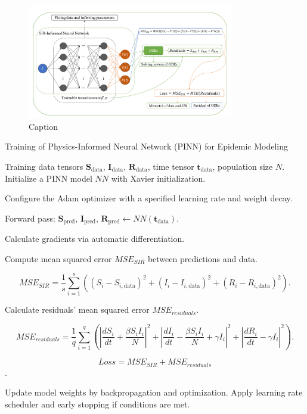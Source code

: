 \documentclass[12pt]{article}
\begin{document}
\begin{figure}
    \centering
    \includegraphics[width=0.8\textwidth]{images/image.png}
    \caption{Caption}
    \label{fig:enter-label}
\end{figure}

\begin{algorithm}[ht]
    \label{alg:PINN}
    \caption{Training of Physics-Informed Neural Network (PINN) for Epidemic Modeling}
    \begin{algorithmic}[1]
        \Require Training data tensors $\bm{S}_{\text{data}}$, $\bm{I}_{\text{data}}$, $\bm{R}_{\text{data}}$, time tensor $\bm{t}_{\text{data}}$, population size $N$.
        \State Initialize a PINN model $NN$ with Xavier initialization.

        \State Configure the Adam optimizer with a specified learning rate and weight decay.
        
        
            \State Forward pass: $\bm{S}_{\text{pred}}$, $\bm{I}_{\text{pred}}$, $\bm{R}_{\text{pred}} \gets NN(\bm{t}_{\text{data}})$.
            
            \State Calculate gradients via automatic differentiation.
            
            \State Compute mean squared error $MSE_{SIR}$ between predictions and data.
            
            \[ MSE_{SIR} = \frac{1}{s}\sum_{i=1}^{s} \left((S_i - S_{i, \text{data}})^2 + (I_i - I_{i, \text{data}})^2 + (R_i - R_{i, \text{data}})^2\right). \]
            
            \State Calculate residuals' mean squared error $MSE_{residuals}$.
            
            \[ MSE_{residuals} = \frac{1}{q}\sum_{i=1}^{q} \left(\left|\frac{dS_i}{dt} + \frac{\beta S_i I_i}{N}\right|^2 + \left|\frac{dI_i}{dt} - \frac{\beta S_i I_i}{N} + \gamma I_i\right|^2 + \left|\frac{dR_i}{dt} - \gamma I_i\right|^2\right). \]


            \[Loss = MSE_{SIR} + MSE_{residuals}\].
            
            \State Update model weights by backpropagation and optimization.
            \State Apply learning rate scheduler and early stopping if conditions are met.
            
        \EndFor
    \end{algorithmic}
\end{algorithm}
\end{document}
